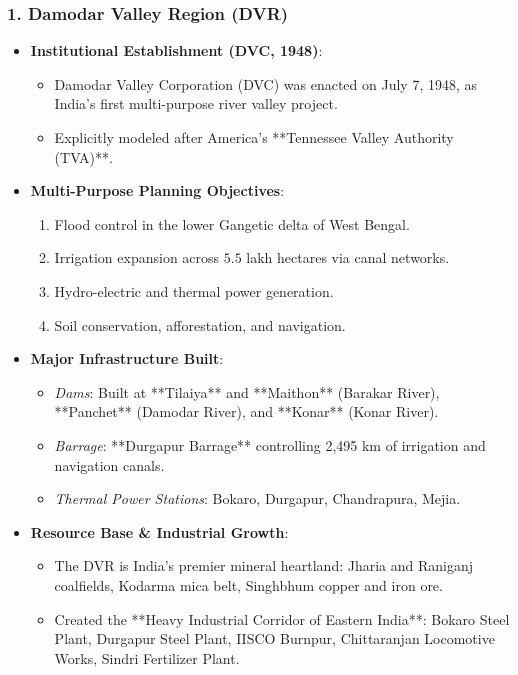 \documentclass[11pt,a4paper]{article}
\begin{document}
\subsubsection{1. Damodar Valley Region (DVR)}
\begin{itemize}[leftmargin=*]
  \item \textbf{Institutional Establishment (DVC, 1948)}:
  \begin{itemize}
    \item Damodar Valley Corporation (DVC) was enacted on July 7, 1948, as India's first multi-purpose river valley project.
    \item Explicitly modeled after America's **Tennessee Valley Authority (TVA)**.
  \end{itemize}

  \item \textbf{Multi-Purpose Planning Objectives}:
  \begin{enumerate}
    \item Flood control in the lower Gangetic delta of West Bengal.
    \item Irrigation expansion across $5.5$ lakh hectares via canal networks.
    \item Hydro-electric and thermal power generation.
    \item Soil conservation, afforestation, and navigation.
  \end{enumerate}

  \item \textbf{Major Infrastructure Built}:
  \begin{itemize}
    \item \textit{Dams}: Built at **Tilaiya** and **Maithon** (Barakar River), **Panchet** (Damodar River), and **Konar** (Konar River).
    \item \textit{Barrage}: **Durgapur Barrage** controlling 2,495 km of irrigation and navigation canals.
    \item \textit{Thermal Power Stations}: Bokaro, Durgapur, Chandrapura, Mejia.
  \end{itemize}

  \item \textbf{Resource Base \& Industrial Growth}:
  \begin{itemize}
    \item The DVR is India's premier mineral heartland: Jharia and Raniganj coalfields, Kodarma mica belt, Singhbhum copper and iron ore.
    \item Created the **Heavy Industrial Corridor of Eastern India**: Bokaro Steel Plant, Durgapur Steel Plant, IISCO Burnpur, Chittaranjan Locomotive Works, Sindri Fertilizer Plant.
  \end{itemize}


\end{itemize}
\end{document}
